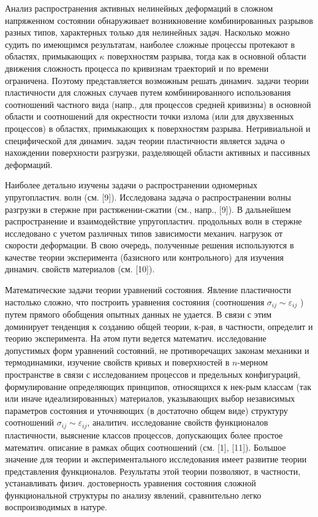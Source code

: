 \documentclass[10pt]{article}
\begin{document}
Анализ распространения активных нелинейных деформаций в сложном напряженном состоянии обнаруживает возникновение комбинированных разрывов разных типов, характерных только для нелинейных задач. Насколько можно судить по имеющимся результатам, наиболее сложные процессы протекают в областях, примыкающих $\kappa$ поверхностям разрыва, тогда как в основной области движения сложность процесса по кривизнам траекторий и по времени ограничена. Поэтому представляется возможным решать динамич. задачи теории пластичности для сложных случаев путем комбинированного использования соотношений частного вида (напр., для процессов средней кривизны) в основной области и соотношений для окрестности точки излома (или для двухзвенных процессов) в областях, примыкающих к поверхностям разрыва. Нетривиальной и специфической для динамич. задач теории пластичности является задача о нахождении поверхности разгрузки, разделяющей области активных и пассивных деформаций.



Наиболее детально изучены задачи о распространении одномерных упругопластич. волн (см. [9]). Исследована задача о распространении волны разгрузки в стержне при растяжении-сжатии (см., напр., [9]). В дальнейшем распространение и взаимодействие упругопластич. продольных волн в стержне исследовано с учетом различных типов зависимости механич. нагрузок от скорости деформации. В свою очередь, полученные решения используются в качестве теории эксперимента (базисного или контрольного) для изучения динамич. свойств материалов (см. [10]).



Математические задачи теории уравнений состояния. Явление пластичности настолько сложно, что построить уравнения состояния (соотношения $\sigma_{i j} \sim \varepsilon_{i j}$ ) путем прямого обобщения опытных данных не удается. В связи с этим доминирует тенденция к созданию общей теории, к-рая, в частности, определит и теорию эксперимента. На әтом пути ведется математич. исследование допустимых форм уравнений состояний, не противоречащих законам механики и термодинамики, изучение свойств кривых и поверхностей в $n$-мерном пространстве в связи с исследованием процессов и предельных конфигураций, формулирование определяющих принципов, относящихся к нек-рым классам (так или иначе идеализированных) материалов, указывающих выбор независимых параметров состояния и уточняющих (в достаточно общем виде) структуру соотношений $\sigma_{i j} \sim \varepsilon_{i j}$, аналитич. исследование свойств функционалов пластичности, выяснение классов процессов, допускающих более простое математич. описание в рамках общих соотношений (см. [1], [11]). Большое значение для теории и әкспериментального исследования имеет развитие теории представления функционалов. Результаты этой теории позволяют, в частности, устанавливать физич. достоверность уравнения состояния сложной функциональной структуры по анализу явлений, сравнительно легко воспроизводимых в натуре.
\end{document}
